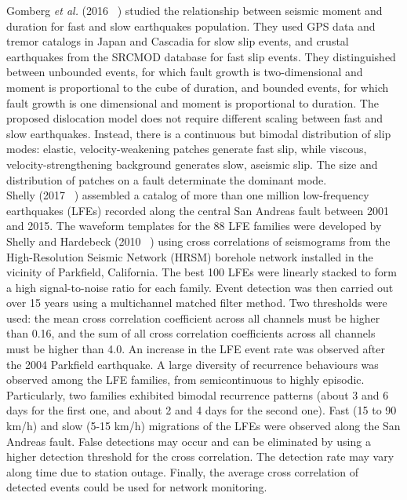 \documentclass[main.tex]{subfiles}
\begin{document}
Gomberg \textit{et al.} (2016 ~\cite{GOM_2016_GRL}) studied the relationship between seismic moment and duration for fast and slow earthquakes population. They used GPS data and tremor catalogs in Japan and Cascadia for slow slip events, and crustal earthquakes from the SRCMOD database for fast slip events. They distinguished between unbounded events, for which fault growth is two-dimensional and moment is proportional to the cube of duration, and bounded events, for which fault growth is one dimensional and moment is proportional to duration. The proposed dislocation model does not require different scaling between fast and slow earthquakes. Instead, there is a continuous but bimodal distribution of slip modes: elastic, velocity-weakening patches generate fast slip, while viscous, velocity-strengthening background generates slow, aseismic slip. The size and distribution of patches on a fault determinate the dominant mode. \\

Shelly (2017 ~\cite{SHE_2017}) assembled a catalog of more than one million low-frequency earthquakes (LFEs) recorded along the central San Andreas fault between 2001 and 2015. The waveform templates for the 88 LFE families were developed by Shelly and Hardebeck (2010 ~\cite{SHE_2010}) using cross correlations of seismograms from the High-Resolution Seismic Network (HRSM) borehole network installed in the vicinity of Parkfield, California. The best 100 LFEs were linearly stacked to form a high signal-to-noise ratio for each family. Event detection was then carried out over 15 years using a multichannel matched filter method. Two thresholds were used: the mean cross correlation coefficient across all channels must be higher than 0.16, and the sum of all cross correlation coefficients across all channels must be higher than 4.0. An increase in the LFE event rate was observed after the 2004 Parkfield earthquake. A large diversity of recurrence behaviours was observed among the LFE families, from semicontinuous to highly episodic. Particularly, two families exhibited bimodal recurrence patterns (about 3 and 6 days for the first one, and about 2 and 4 days for the second one). Fast (15 to 90 km/h) and slow (5-15 km/h) migrations of the LFEs were observed along the San Andreas fault. False detections may occur and can be eliminated by using a higher detection threshold for the cross correlation. The detection rate may vary along time due to station outage. Finally, the average cross correlation of detected events could be used for network monitoring. \\
\end{document}
